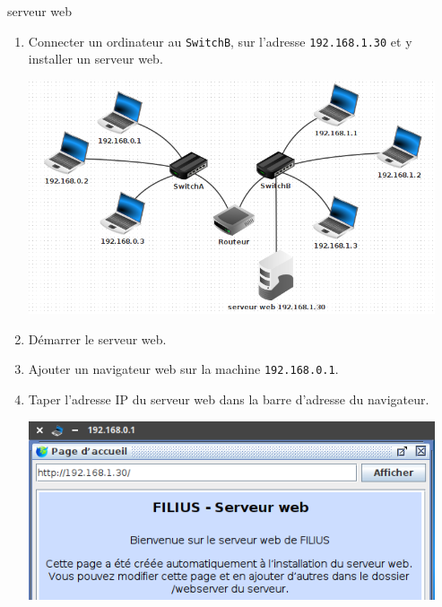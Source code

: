 \documentclass[a4paper,dvipsnames]{article}
\begin{document}
\medskip

\begin{activite}[breakable]{serveur web}{}
  \begin{enumerate}
    \item Connecter un ordinateur au \texttt{SwitchB}, sur l'adresse \texttt{192.168.1.30} et y installer un serveur web.

      \begin{center}
	\includegraphics[width=12cm]{img/serveurweb.png}
      \end{center}

    \item Démarrer le serveur web.
    \item Ajouter un navigateur web sur la machine \texttt{192.168.0.1}.
    \item Taper l'adresse IP du serveur web dans la barre d'adresse du navigateur.

      \begin{center}
	\includegraphics[width=12cm]{img/nav1.png}
      \end{center}
  \end{enumerate}
\end{activite}

\medskip
\end{document}
